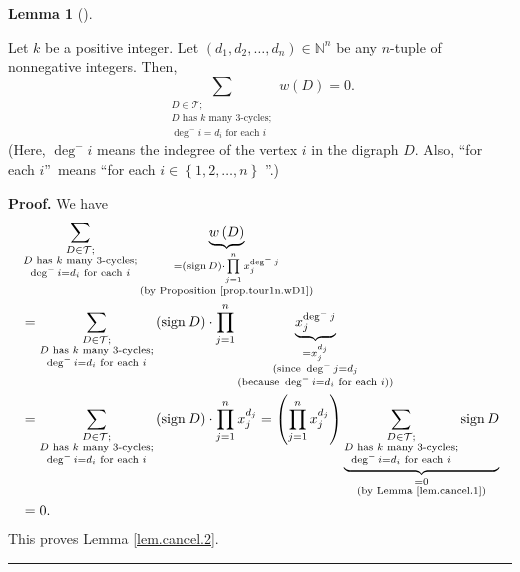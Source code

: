\documentclass[numbers=enddot,12pt,final,onecolumn,notitlepage]{scrartcl}%
\numberwithin{exer}{subsection}
\theoremstyle{definition}
\newtheorem{lem}[theo]{Lemma}
\newenvironment{lemma}[1][]
{\begin{lem}[#1]\begin{leftbar}}
{\end{leftbar}\end{lem}}
\newenvironment{proof}[1][Proof]{\noindent\textbf{#1.} }{\ \rule{0.5em}{0.5em}}
\let\sumnonlimits\sum
\let\prodnonlimits\prod
\renewcommand{\sum}{\sumnonlimits\limits}
\renewcommand{\prod}{\prodnonlimits\limits}
\begin{document}
\begin{lemma}
\label{lem.cancel.2}Let $k$ be a positive integer. Let $\left(  d_{1}%
,d_{2},\ldots,d_{n}\right)  \in\mathbb{N}^{n}$ be any $n$-tuple of nonnegative
integers. Then,%
\[
\sum_{\substack{D\in\mathcal{T};\\D\text{ has }k\text{ many }3\text{-cycles}%
;\\\deg^{-}i=d_{i}\text{ for each }i}}w\left(  D\right)  =0.
\]
(Here, $\deg^{-}i$ means the indegree of the vertex $i$ in the digraph $D$.
Also, \textquotedblleft for each $i$\textquotedblright\ means
\textquotedblleft for each $i\in\left\{  1,2,\ldots,n\right\}  $%
\textquotedblright.)
\end{lemma}

\begin{proof}
We have%
\begin{align*}
& \sum_{\substack{D\in\mathcal{T};\\D\text{ has }k\text{ many }3\text{-cycles}%
;\\\deg^{-}i=d_{i}\text{ for each }i}}\underbrace{w\left(  D\right)
}_{\substack{=\left(  \operatorname*{sign}D\right)  \cdot\prod_{j=1}^{n}%
x_{j}^{\deg^{-}j}\\\text{(by Proposition \ref{prop.tour1n.wD1})}}}\\
& =\sum_{\substack{D\in\mathcal{T};\\D\text{ has }k\text{ many }%
3\text{-cycles};\\\deg^{-}i=d_{i}\text{ for each }i}}\left(
\operatorname*{sign}D\right)  \cdot\prod_{j=1}^{n}\underbrace{x_{j}^{\deg
^{-}j}}_{\substack{=x_{j}^{d_{j}}\\\text{(since }\deg^{-}j=d_{j}%
\\\text{(because }\deg^{-}i=d_{i}\text{ for each }i\text{))}}}\\
& =\sum_{\substack{D\in\mathcal{T};\\D\text{ has }k\text{ many }%
3\text{-cycles};\\\deg^{-}i=d_{i}\text{ for each }i}}\left(
\operatorname*{sign}D\right)  \cdot\prod_{j=1}^{n}x_{j}^{d_{j}}=\left(
\prod_{j=1}^{n}x_{j}^{d_{j}}\right)  \underbrace{\sum_{\substack{D\in
\mathcal{T};\\D\text{ has }k\text{ many }3\text{-cycles};\\\deg^{-}%
i=d_{i}\text{ for each }i}}\operatorname*{sign}D}_{\substack{=0\\\text{(by
Lemma \ref{lem.cancel.1})}}}\\
& =0.
\end{align*}
This proves Lemma \ref{lem.cancel.2}.
\end{proof}
\end{document}
